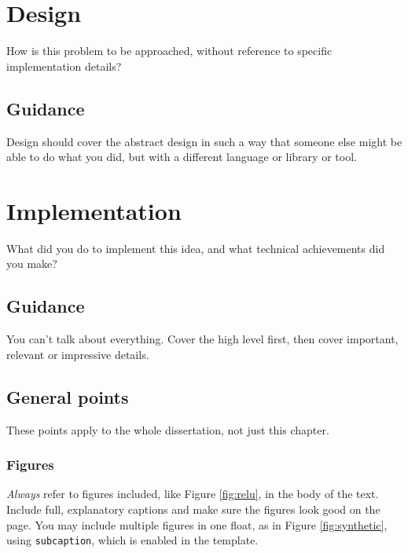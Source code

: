 \documentclass{l4proj}
\begin{document}
\chapter{Design}
How is this problem to be approached, without reference to specific implementation details? 
\section{Guidance}
Design should cover the abstract design in such a way that someone else might be able to do what you did, but with a different language or library or tool. 

\chapter{Implementation}
What did you do to implement this idea, and what technical achievements did you make?
\section{Guidance}
You can't talk about everything. Cover the high level first, then cover important, relevant or impressive details.



\section{General points}

These points apply to the whole dissertation, not just this chapter.



\subsection{Figures}
\emph{Always} refer to figures included, like Figure \ref{fig:relu}, in the body of the text. Include full, explanatory captions and make sure the figures look good on the page.
You may include multiple figures in one float, as in Figure \ref{fig:synthetic}, using \texttt{subcaption}, which is enabled in the template.
\end{document}
